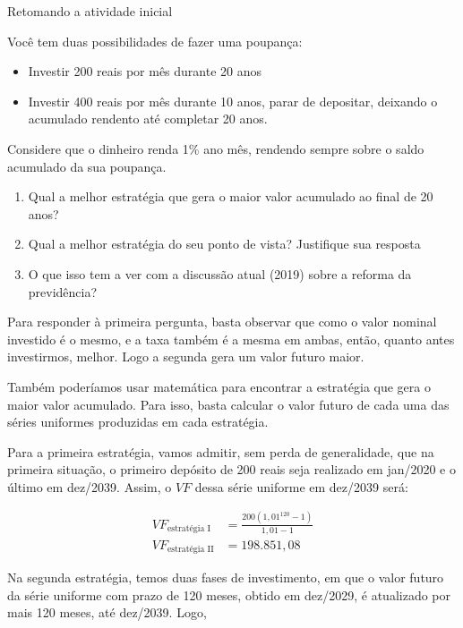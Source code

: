 \begin{example}{Retomando a atividade inicial}
\label{fin-exemp-1}

Você tem duas possibilidades de fazer uma poupança:
\begin{itemize}
\item Investir 200 reais por mês durante 20 anos
\item Investir 400 reais por mês durante 10 anos, parar de depositar, deixando o acumulado rendento até completar 20 anos.

\end{itemize}

Considere que o dinheiro renda 1\% ano mês, rendendo sempre sobre o saldo acumulado da sua poupança.

\begin{enumerate}

\item Qual a melhor estratégia que gera o maior valor acumulado ao final de 20 anos?

\item Qual a melhor estratégia do seu ponto de vista? Justifique sua resposta

\item O que isso tem a ver com a discussão atual (2019) sobre a reforma da previdência?

\end{enumerate}

Para responder à primeira pergunta, basta observar que como o valor nominal investido é o mesmo, e a taxa também é a mesma em ambas, então, quanto antes investirmos, melhor. Logo a segunda gera um valor futuro maior.

Também poderíamos usar matemática para encontrar a estratégia que gera o maior valor acumulado. Para isso, basta calcular o valor futuro de cada uma das séries uniformes produzidas em cada estratégia. 

Para a primeira estratégia, vamos admitir, sem perda de generalidade, que na primeira situação, o primeiro depósito de 200 reais seja realizado em jan/2020 e o último em dez/2039. Assim, o $\mathit{VF}$ dessa série uniforme em dez/2039 será: 


\begin{align*}
\mathit{VF}_{\text{estratégia I}}&=\frac{200(1,01^{120}-1)}{1,01-1}\\
\mathit{VF}_{\text{estratégia II}}&=198.851,08
\end{align*}

Na segunda estratégia, temos duas fases de investimento, em que o valor futuro da série uniforme com prazo de 120 meses, obtido em dez/2029, é atualizado por mais 120 meses, até dez/2039. Logo, 


\end{example}
